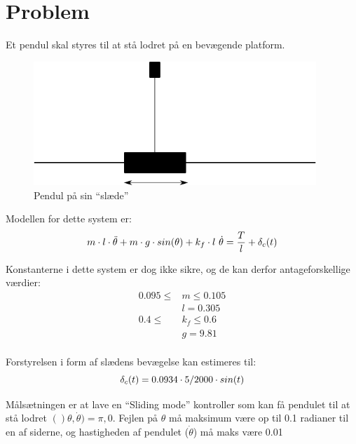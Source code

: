 \chapter{Problem}
Et pendul skal styres til at stå lodret på en bevægende platform.
\begin{figure}[htbp]
        \centering
        \includegraphics[width=0.95\textwidth]{pendul.png}
        \caption{Pendul på sin ``slæde''}
        \label{fig:label}
\end{figure}
Modellen for dette system er:
\begin{equation}
        m\cdot l \cdot \Ddot{\theta} + m \cdot g \cdot sin(\theta) + k_f \cdot l \ \dot{\theta} = \frac{T}{l} + \delta_c(t)
\end{equation}

Konstanterne i dette system er dog ikke sikre, og de kan derfor antageforskellige værdier:
\begin{equation}
        \begin{split}
                0.095 \leq &m \leq 0.105 \\
                &l = 0.305 \\
                0.4 \leq &k_f \leq 0.6 \\
                &g = 9.81 \\
        \end{split}
\end{equation}

Forstyrelsen i form af slædens bevægelse kan estimeres til:
\begin{equation}
        \delta_c(t) = 0.0934 \cdot 5/2000 \cdot sin(t)
\end{equation}

Målsætningen er at lave en ``Sliding mode'' kontroller som kan få pendulet til at stå lodret $()\theta, \dot{\theta})= \pi, 0$. Fejlen på $\theta$ må maksimum være op til 0.1 radianer til en af siderne, og hastigheden af pendulet ($\dot{\theta}$) må maks være 0.01
